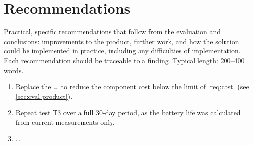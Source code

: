 \chapter{Recommendations}
\label{ch:recommendations}

\begin{guidance}
Practical, specific recommendations that follow from the evaluation and
conclusions: improvements to the product, further work, and how the solution
could be implemented in practice, including any difficulties of
implementation. Each recommendation should be traceable to a finding.
Typical length: 200--400 words.
\end{guidance}

\begin{enumerate}
  \item Replace the \ldots\ to reduce the component cost below the limit of
    \cref{req:cost} (see \cref{sec:eval-product}).
  \item Repeat test T3 over a full 30-day period, as the battery life was
    calculated from current measurements only.
  \item \ldots
\end{enumerate}
